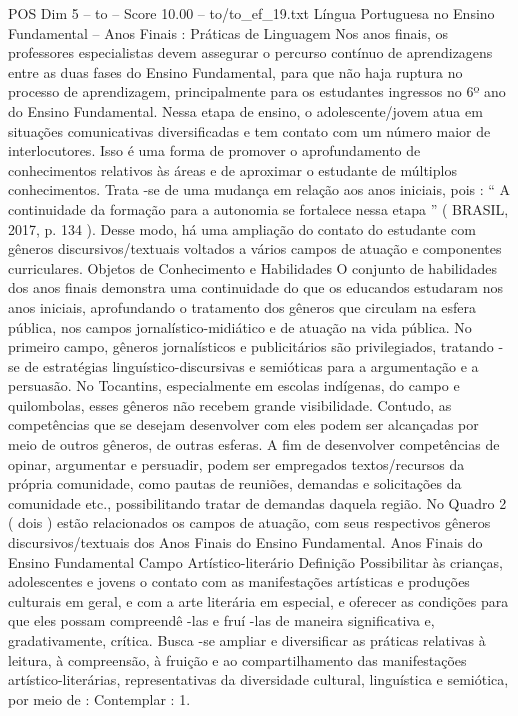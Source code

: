 \begin{textsample}{POS Dim 5 – to – Score 10.00 – to/to\_ef\_19.txt}  \label{ex:f5_pos_027}
Língua Portuguesa no Ensino Fundamental – Anos Finais : Práticas de Linguagem Nos anos finais, os professores especialistas devem assegurar o percurso contínuo de aprendizagens entre as duas fases do Ensino Fundamental, para que não haja ruptura no processo de aprendizagem, principalmente para os estudantes ingressos no 6º ano do Ensino Fundamental.
Nessa etapa de ensino, o adolescente/jovem atua em situações comunicativas diversificadas e tem contato com um número maior de interlocutores.
Isso é uma forma de promover o aprofundamento de conhecimentos relativos às áreas e de aproximar o estudante de múltiplos conhecimentos.
Trata -se de uma mudança em relação aos anos iniciais, pois : “ A continuidade da formação para a autonomia se fortalece nessa etapa ” ( BRASIL, 2017, p. 134 ).
Desse modo, há uma ampliação do contato do estudante com gêneros discursivos/textuais voltados a vários campos de atuação e componentes curriculares.
Objetos de Conhecimento e Habilidades O conjunto de habilidades dos anos finais demonstra uma continuidade do que os educandos estudaram nos anos iniciais, aprofundando o tratamento dos gêneros que circulam na esfera pública, nos campos jornalístico-midiático e de atuação na vida pública.
No primeiro campo, gêneros jornalísticos e publicitários são privilegiados, tratando -se de estratégias linguístico-discursivas e semióticas para a argumentação e a persuasão.
No Tocantins, especialmente em escolas indígenas, do campo e quilombolas, esses gêneros não recebem grande visibilidade.
Contudo, as competências que se desejam desenvolver com eles podem ser alcançadas por meio de outros gêneros, de outras esferas.
A fim de desenvolver competências de opinar, argumentar e persuadir, podem ser empregados textos/recursos da própria comunidade, como pautas de reuniões, demandas e solicitações da comunidade etc., possibilitando tratar de demandas daquela região.
No Quadro 2 ( dois ) estão relacionados os campos de atuação, com seus respectivos gêneros discursivos/textuais dos Anos Finais do Ensino Fundamental.
Anos Finais do Ensino Fundamental Campo Artístico-literário Definição Possibilitar às crianças, adolescentes e jovens o contato com as manifestações artísticas e produções culturais em geral, e com a arte literária em especial, e oferecer as condições para que eles possam compreendê -las e fruí -las de maneira significativa e, gradativamente, crítica.
Busca -se ampliar e diversificar as práticas relativas à leitura, à compreensão, à fruição e ao compartilhamento das manifestações artístico-literárias, representativas da diversidade cultural, linguística e semiótica, por meio de : Contemplar : 1.

\end{textsample}
